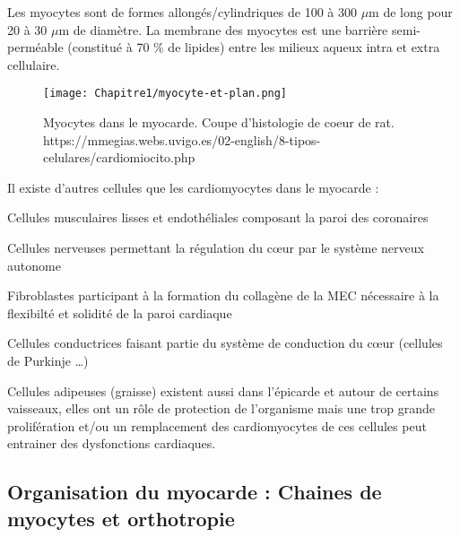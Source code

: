 Les myocytes sont de formes 
allongés/cylindriques de 100 à 300 $\mu$m de long pour 20 à 30 $\mu$m de diamètre. 
La membrane des myocytes est une barrière semi-perméable (constitué à 70  \% de lipides) 
entre les milieux aqueux intra et extra cellulaire. 


\begin{figure}[!hb]
  \begin{center}
    \texttt{[image: Chapitre1/myocyte-et-plan.png]}
  \end{center}
  \caption{Myocytes dans le myocarde. Coupe d'histologie de  coeur de rat. https://mmegias.webs.uvigo.es/02-english/8-tipos-celulares/cardiomiocito.php}
  \label{fig:description_histo}
\end{figure}

Il existe d’autres cellules que les cardiomyocytes dans le myocarde : 


 \begin{bulletList}
 \item Cellules musculaires lisses et endothéliales composant la paroi des coronaires
 \item Cellules nerveuses permettant la régulation du cœur par le système nerveux autonome
 \item Fibroblastes participant à la formation du collagène de la MEC nécessaire à la flexibilté et solidité de la paroi cardiaque \cite{BAYOMY2012823}
 \item Cellules conductrices faisant partie du système de conduction du cœur (cellules de Purkinje …)
 \item Cellules adipeuses (graisse) existent aussi dans l’épicarde et autour de certains vaisseaux, elles ont un rôle de protection de l’organisme mais une trop grande prolifération et/ou un remplacement des cardiomyocytes de ces cellules peut entrainer des dysfonctions cardiaques. \cite{samanta_role_2016} \cite{hatem_epicardial_2014}
\end{bulletList}



\clearpage
\subsection{Organisation du myocarde : Chaines de myocytes et orthotropie}

